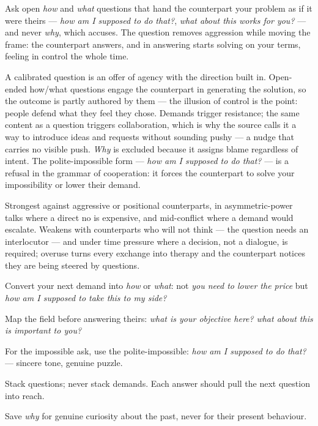 \begin{core}
Ask open \emph{how} and \emph{what} questions that hand the counterpart your problem as if it were theirs --- \emph{how am I supposed to do that?}, \emph{what about this works for you?} --- and never \emph{why}, which accuses. The question removes aggression while moving the frame: the counterpart answers, and in answering starts solving on your terms, feeling in control the whole time.
\end{core}
\begin{mechanism}
A calibrated question is an offer of agency with the direction built in. Open-ended how/what questions engage the counterpart in generating the solution, so the outcome is partly authored by them --- the illusion of control is the point: people defend what they feel they chose. Demands trigger resistance; the same content as a question triggers collaboration, which is why the source calls it a way to introduce ideas and requests without sounding pushy --- a nudge that carries no visible push. \emph{Why} is excluded because it assigns blame regardless of intent. The polite-impossible form --- \emph{how am I supposed to do that?} --- is a refusal in the grammar of cooperation: it forces the counterpart to solve your impossibility or lower their demand.
\end{mechanism}
\begin{conditions}
Strongest against aggressive or positional counterparts, in asymmetric-power talks where a direct no is expensive, and mid-conflict where a demand would escalate. Weakens with counterparts who will not think --- the question needs an interlocutor --- and under time pressure where a decision, not a dialogue, is required; overuse turns every exchange into therapy and the counterpart notices they are being steered by questions.
\end{conditions}
\begin{application}
  \item Convert your next demand into \emph{how} or \emph{what}: not \emph{you need to lower the price} but \emph{how am I supposed to take this to my side?}
  \item Map the field before answering theirs: \emph{what is your objective here?} \emph{what about this is important to you?}
  \item For the impossible ask, use the polite-impossible: \emph{how am I supposed to do that?} --- sincere tone, genuine puzzle.
  \item Stack questions; never stack demands. Each answer should pull the next question into reach.
  \item Save \emph{why} for genuine curiosity about the past, never for their present behaviour.
\end{application}
